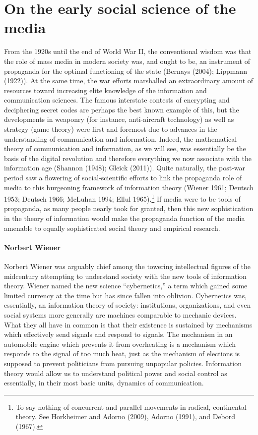 \documentclass[12pt,book]{article}
\begin{document}
\section{On the early social science of the
media}\label{on-the-early-social-science-of-the-media}

From the 1920s until the end of World War II, the conventional wisdom
was that the role of mass media in modern society was, and ought to be,
an instrument of propaganda for the optimal functioning of the state
(Bernays (2004); Lippmann (1922)). At the same time, the war efforts
marshalled an extraordinary amount of resources toward increasing elite
knowledge of the information and communication sciences. The famous
interstate contests of encrypting and deciphering secret codes are
perhaps the best known example of this, but the developments in weaponry
(for instance, anti-aircraft technology) as well as strategy (game
theory) were first and foremost due to advances in the understanding of
communication and information. Indeed, the mathematical theory of
communication and information, as we will see, was essentially be the
basis of the digital revolution and therefore everything we now
associate with the information age (Shannon (1948); Gleick (2011)).
Quite naturally, the post-war period saw a flowering of
social-scientific efforts to link the propaganda role of media to this
burgeoning framework of information theory (Wiener 1961; Deutsch 1953;
Deutsch 1966; McLuhan 1994; Ellul 1965).\footnote{To say nothing of
  concurrent and parallel movements in radical, continental theory. See
  Horkheimer and Adorno (2009), Adorno (1991), and Debord (1967).} If
media were to be tools of propaganda, as many people nearly took for
granted, then this new sophistication in the theory of information would
make the propaganda function of the media amenable to equally
sophisticated social theory and empirical research.

\paragraph{Norbert Wiener}\label{norbert-wiener}

Norbert Wiener was arguably chief among the towering intellectual
figures of the midcentury attempting to understand society with the new
tools of information theory. Wiener named the new science
``cybernetics,'' a term which gained some limited currency at the time
but has since fallen into oblivion. Cybernetics was, essentially, an
information theory of society: institutions, organizations, and even
social systems more generally are machines comparable to mechanic
devices. What they all have in common is that their existence is
sustained by mechanisms which effectively send signals and respond to
signals. The mechanism in an automobile engine which prevents it from
overheating is a mechanism which responds to the signal of too much
heat, just as the mechanism of elections is supposed to prevent
politicians from pursuing unpopular policies. Information theory would
allow us to understand political power and social control as
essentially, in their most basic units, dynamics of communication.
\end{document}
